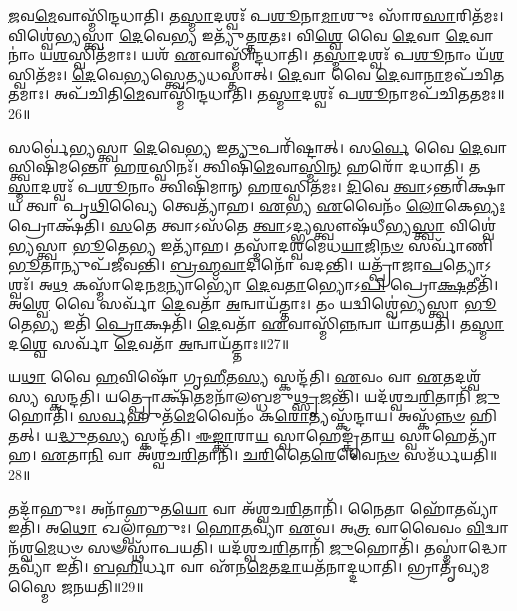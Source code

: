 \-\ul{𑌜}\-𑌵\-\ul{𑌮𑍇}\-𑌵𑌾𑌸𑍍𑌮𑌿᳴𑌨𑍍𑌦𑌧𑌾𑌤𑌿।
𑌤\-\ul{𑌸𑍍𑌮𑌾}\-𑌦𑌶𑍍𑌵𑌃᳴ 𑌪\-\ul{𑌶𑍂}\-𑌨𑌾\-\ul{𑌮𑌾}\-𑌶𑍁𑌃 𑌸𑌾᳴𑌰\-\ul{𑌸𑌾}\-𑌰𑌿𑌤᳴𑌮𑌃।
𑌵𑌿𑌶𑍍𑌵𑍇॑𑌭𑍍𑌯𑌸𑍍𑌤𑍍𑌵𑌾 \ul{𑌦𑍇}\-𑌵𑍇\-\ul{𑌭𑍍𑌯} 𑌇𑌤𑍍𑌯𑍁᳴𑌤𑍍𑌤\-\ul{𑌰}\-𑌤𑌃।
𑌵𑌿\-\ul{𑌶𑍍𑌵𑍇} 𑌵𑍈 \ul{𑌦𑍇}\-𑌵𑌾 \ul{𑌦𑍇}\-𑌵𑌾𑌨𑌾𑌂॑ 𑌯\-\ul{𑌶}\-𑌸𑍍𑌵𑌿𑌤᳴𑌮𑌾𑌃।
𑌯𑌶᳴ \ul{𑌏}\-𑌵𑌾𑌸𑍍𑌮𑌿᳴𑌨𑍍𑌦𑌧𑌾𑌤𑌿।
𑌤\-\ul{𑌸𑍍𑌮𑌾}\-𑌦𑌶𑍍𑌵𑌃᳴ 𑌪\-\ul{𑌶𑍂}\-𑌨𑌾𑌂 𑌯᳴\-\ul{𑌶}\-𑌸𑍍𑌵𑌿𑌤᳴𑌮𑌃।
\-\ul{𑌦𑍇}\-𑌵𑍇\-\ul{𑌭𑍍𑌯}\-𑌸𑍍𑌤𑍍𑌵𑍇\-\ul{𑌤𑍍𑌯}\-𑌧𑌸𑍍𑌤𑌾॑𑌤𑍍।
\-\ul{𑌦𑍇}\-𑌵𑌾 𑌵𑍈 \ul{𑌦𑍇}\-𑌵𑌾\-\ul{𑌨𑌾}\-𑌮𑌪᳴𑌚𑌿𑌤𑌤𑌮𑌾𑌃।
𑌅𑌪᳴𑌚𑌿𑌤𑌿\-\ul{𑌮𑍇}\-𑌵𑌾𑌸𑍍𑌮𑌿᳴𑌨𑍍𑌦𑌧𑌾𑌤𑌿।
𑌤\-\ul{𑌸𑍍𑌮𑌾}\-𑌦𑌶𑍍𑌵𑌃᳴ 𑌪\-\ul{𑌶𑍂}\-𑌨𑌾𑌮𑌪᳴𑌚𑌿𑌤𑌤𑌮𑌃॥26॥

𑌸𑌰𑍍𑌵𑍇॑𑌭𑍍𑌯𑌸𑍍𑌤𑍍𑌵𑌾 \ul{𑌦𑍇}\-𑌵𑍇\-\ul{𑌭𑍍𑌯} 𑌇\-\ul{𑌤𑍍𑌯𑍁}\-𑌪𑌰𑌿᳴𑌷𑍍𑌟𑌾𑌤𑍍।
𑌸\-\ul{𑌰𑍍𑌵𑍇} 𑌵𑍈 \ul{𑌦𑍇}\-𑌵𑌾𑌸𑍍𑌤𑍍𑌵𑌿𑌷𑌿᳴𑌮𑌨𑍍𑌤𑍋 𑌹\-\ul{𑌰}\-𑌸𑍍𑌵𑌿𑌨𑌃᳴।
𑌤𑍍𑌵𑌿𑌷𑌿᳴\-\ul{𑌮𑍇}\-𑌵𑌾\-\ul{𑌸𑍍𑌮𑌿}\-\-\ul{𑌨𑍍} 𑌹𑌰𑍋᳴ 𑌦𑌧𑌾𑌤𑌿।
𑌤\-\ul{𑌸𑍍𑌮𑌾}\-𑌦𑌶𑍍𑌵𑌃᳴ 𑌪\-\ul{𑌶𑍂}\-𑌨𑌾𑌂 𑌤𑍍𑌵𑌿𑌷𑌿᳴𑌮𑌾𑌨𑍍‌ 𑌹\-\ul{𑌰}\-𑌸𑍍𑌵𑌿𑌤᳴𑌮𑌃।
\-\ul{𑌦𑌿}\-𑌵𑍇 \ul{𑌤𑍍𑌵𑌾}\-\-𑌽𑌨𑍍𑌤𑌰𑌿᳴𑌕𑍍𑌷𑌾𑌯 𑌤𑍍𑌵𑌾 𑌪𑍃\-\ul{𑌥𑌿}\-𑌵𑍍𑌯𑍈 𑌤𑍍𑌵𑍇𑌤𑍍𑌯𑌾᳴𑌹।
\-\ul{𑌏}\-𑌭𑍍𑌯 \ul{𑌏}\-𑌵𑍈𑌨𑌂᳴ \ul{𑌲𑍋}\-𑌕𑍇\-\ul{𑌭𑍍𑌯𑌃} 𑌪𑍍𑌰𑍋𑌕𑍍𑌷᳴𑌤𑌿।
\-\ul{𑌸}\-𑌤𑍇 𑌤𑍍𑌵𑌾\-𑌽𑌸᳴𑌤𑍇 \ul{𑌤𑍍𑌵𑌾}\-\-𑌽𑌦𑍍𑌭𑍍𑌯𑌸𑍍𑌤𑍍𑌵𑍗𑌷᳴𑌧𑍀𑌭𑍍𑌯\-\ul{𑌸𑍍𑌤𑍍𑌵𑌾} 𑌵𑌿𑌶𑍍𑌵𑍇॑𑌭𑍍𑌯𑌸𑍍𑌤𑍍𑌵𑌾 \ul{𑌭𑍂}\-𑌤𑍇\-\ul{𑌭𑍍𑌯} 𑌇𑌤𑍍𑌯𑌾᳴𑌹।
𑌤𑌸𑍍𑌮𑌾᳴𑌦𑌶𑍍𑌵𑌮𑍇𑌧\-\ul{𑌯𑌾}\-𑌜𑌿\-\ul{𑌨}\-\-\ul{𑍞} 𑌸𑌰𑍍𑌵𑌾᳴𑌣𑌿 \ul{𑌭𑍂}\-𑌤𑌾𑌨𑍍𑌯𑍁𑌪᳴𑌜𑍀𑌵𑌨𑍍𑌤𑌿।
\-\ul{𑌬𑍍𑌰}\-\-\ul{𑌹𑍍𑌮}\-\-\ul{𑌵𑌾}\-𑌦𑌿𑌨𑍋᳴ 𑌵𑌦𑌨𑍍𑌤𑌿।
𑌯𑌤𑍍𑌪𑍍𑌰𑌾᳴𑌜𑌾\-\ul{𑌪}\-𑌤𑍍𑌯𑍋\-𑌽𑌶𑍍𑌵𑌃᳴।
𑌅\-\ul{𑌥} 𑌕𑌸𑍍𑌮𑌾᳴𑌦𑍇𑌨\-\ul{𑌮}\-𑌨𑍍𑌯𑌾𑌭𑍍𑌯𑍋᳴ \ul{𑌦𑍇}\-𑌵\-\ul{𑌤𑌾}\-𑌭𑍍𑌯𑍋𑌽\-\ul{𑌪𑌿} 𑌪𑍍𑌰𑍋\-\ul{𑌕𑍍𑌷}\-𑌤𑍀𑌤𑌿᳴।
𑌅\-\ul{𑌶𑍍𑌵𑍇} 𑌵𑍈 𑌸𑌰𑍍𑌵𑌾᳴ \ul{𑌦𑍇}\-𑌵𑌤𑌾᳴ \ul{𑌅}\-𑌨𑍍𑌵𑌾𑌯᳴𑌤𑍍𑌤𑌾𑌃।
𑌤𑌂 𑌯𑌦𑍍𑌵𑌿𑌶𑍍𑌵𑍇॑𑌭𑍍𑌯𑌸𑍍𑌤𑍍𑌵𑌾 \ul{𑌭𑍂}\-𑌤𑍇\-\ul{𑌭𑍍𑌯} 𑌇𑌤𑌿᳴ \ul{𑌪𑍍𑌰𑍋}\-𑌕𑍍𑌷𑌤𑌿᳴।
\-\ul{𑌦𑍇}\-𑌵𑌤𑌾᳴ \ul{𑌏}\-𑌵𑌾𑌸𑍍𑌮𑌿᳴\-\ul{𑌨𑍍𑌨}\-𑌨𑍍𑌵𑌾 𑌯𑌾᳴𑌤𑌯𑌤𑌿।
𑌤\-\ul{𑌸𑍍𑌮𑌾}\-𑌦\-\ul{𑌶𑍍𑌵𑍇} 𑌸𑌰𑍍𑌵𑌾᳴ \ul{𑌦𑍇}\-𑌵𑌤𑌾᳴ \ul{𑌅}\-𑌨𑍍𑌵𑌾𑌯᳴𑌤𑍍𑌤𑌾𑌃॥27॥\anuvakamend[\-\ul{𑌸𑌾}\-\-\ul{𑌰}\-\-\ul{𑌸𑌾}\-𑌰𑌿\-\ul{𑌤}\-𑌮𑍋\-𑌽𑌪᳴𑌚𑌿𑌤𑌤𑌮𑌃 𑌪𑍍𑌰𑌾𑌜𑌾\-\ul{𑌪}\-𑌤𑍍𑌯𑍋\-𑌽\-\ul{𑌶𑍍𑌵𑌃} 𑌪𑌞𑍍𑌚᳴ 𑌚]

𑌯\-\ul{𑌥𑌾} 𑌵𑍈 \ul{𑌹}\-𑌵𑌿𑌷𑍋᳴ 𑌗𑍃\-\ul{𑌹𑍀}\-𑌤\-\ul{𑌸𑍍𑌯} 𑌸𑍍𑌕𑌨𑍍𑌦᳴𑌤𑌿।
\-\ul{𑌏}\-𑌵𑌂 𑌵𑌾 \ul{𑌏}\-𑌤𑌦𑌶𑍍𑌵᳴𑌸𑍍𑌯 𑌸𑍍𑌕𑌨𑍍𑌦𑌤𑌿।
𑌯𑌤𑍍𑌪𑍍𑌰𑍋𑌕𑍍𑌷𑌿᳴\-\ul{𑌤}\-𑌮𑌨𑌾᳴𑌲𑌬𑍍𑌧𑌮𑍁\-\ul{𑌥𑍍𑌸𑍃}\-𑌜𑌨𑍍𑌤𑌿᳴।
𑌯𑌦᳴𑌶𑍍𑌵𑌚\-\ul{𑌰𑌿}\-𑌤𑌾𑌨𑌿᳴ \ul{𑌜𑍁}\-𑌹𑍋𑌤𑌿᳴।
\-\ul{𑌸}\-\-\ul{𑌰𑍍𑌵}\-𑌹𑍁𑌤᳴\-\ul{𑌮𑍇}\-𑌵𑍈𑌨𑌂᳴ 𑌕\-\ul{𑌰𑍋}\-𑌤𑍍𑌯𑌸𑍍𑌕᳴𑌨𑍍𑌦𑌾𑌯।
𑌅𑌸𑍍𑌕᳴\-\ul{𑌨𑍍𑌨}\-\-\ul{𑍞} 𑌹𑌿 𑌤𑌤𑍍।
𑌯\-\ul{𑌦𑍍𑌧𑍁}\-𑌤\-\ul{𑌸𑍍𑌯} 𑌸𑍍𑌕𑌨𑍍𑌦᳴𑌤𑌿।
\-\ul{𑌈}\-\-\ul{𑌙𑍍𑌕𑌾}\-𑌰𑌾\-\ul{𑌯} 𑌸𑍍𑌵𑌾𑌹𑍇𑌙𑍍𑌕𑍃᳴𑌤𑌾\-\ul{𑌯} 𑌸𑍍𑌵𑌾𑌹𑍇𑌤𑍍𑌯𑌾᳴𑌹।
\-\ul{𑌏}\-𑌤𑌾\-\ul{𑌨𑌿} 𑌵𑌾 𑌅᳴𑌶𑍍𑌵𑌚\-\ul{𑌰𑌿}\-𑌤𑌾𑌨𑌿᳴।
\-\ul{𑌚}\-\-\ul{𑌰𑌿}\-𑌤𑍈\-\ul{𑌰𑍇}\-𑌵𑍈\-\ul{𑌨}\-\-\ul{𑍞} 𑌸𑌮᳴𑌰𑍍𑌧𑌯𑌤𑌿॥28॥

𑌤𑌦𑌾᳴𑌹𑍁𑌃।
𑌅𑌨𑌾᳴𑌹𑍁𑌤\-\ul{𑌯𑍋} 𑌵𑌾 𑌅᳴𑌶𑍍𑌵𑌚\-\ul{𑌰𑌿}\-𑌤𑌾𑌨𑌿᳴।
𑌨𑍈𑌤𑌾 𑌹𑍋᳴\-\ul{𑌤}\-𑌵𑍍𑌯𑌾᳴ 𑌇𑌤𑌿᳴।
𑌅\-\ul{𑌥𑍋} 𑌖𑌲𑍍𑌵𑌾᳴𑌹𑍁𑌃।
\-\ul{𑌹𑍋}\-\-\ul{𑌤}\-𑌵𑍍𑌯𑌾᳴ \ul{𑌏}\-𑌵।
𑌅\-\ul{𑌤𑍍𑌰} 𑌵𑌾𑌵𑍈𑌵𑌂 \ul{𑌵𑌿}\-𑌦𑍍𑌵𑌾𑌨᳴𑌶𑍍𑌵\-\ul{𑌮𑍇}\-𑌧𑍞 𑌸𑍟𑌸𑍍𑌥𑌾᳴𑌪𑌯𑌤𑌿।
𑌯𑌦᳴𑌶𑍍𑌵𑌚\-\ul{𑌰𑌿}\-𑌤𑌾𑌨𑌿᳴ \ul{𑌜𑍁}\-𑌹𑍋𑌤𑌿᳴।
𑌤𑌸𑍍𑌮𑌾॑𑌦𑍍𑌧𑍋\-\ul{𑌤}\-𑌵𑍍𑌯𑌾᳴ 𑌇𑌤𑌿᳴।
\-\ul{𑌬}\-\-\ul{𑌹𑌿}\-𑌰𑍍𑌧𑌾 𑌵𑌾 𑌏᳴𑌨\-\ul{𑌮𑍇}\-𑌤\-\ul{𑌦𑌾}\-𑌯𑌤᳴𑌨𑌾𑌦𑍍𑌦𑌧𑌾𑌤𑌿।
𑌭𑍍𑌰𑌾𑌤𑍃᳴𑌵𑍍𑌯𑌮𑌸𑍍𑌮𑍈 𑌜𑌨𑌯𑌤𑌿॥29॥

